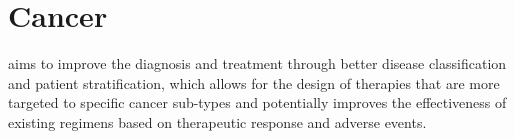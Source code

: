 \section{Cancer}
\label{cancer-discussion}


 aims to improve the diagnosis and treatment through
better disease classification and patient stratification, which allows for the
design of therapies that are more targeted to specific cancer sub-types and
potentially improves the effectiveness of existing regimens based on therapeutic
response and adverse events.

\clearpage

